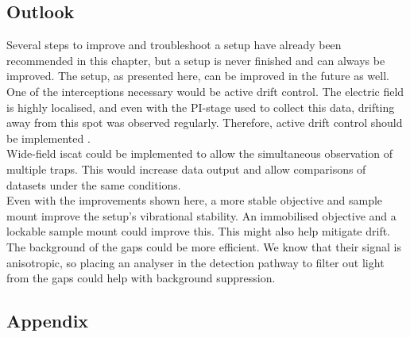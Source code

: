 \subsection*{Outlook}
Several steps to improve and troubleshoot a setup have already been recommended in this chapter, but a setup is never finished and can always be improved. The setup, as presented here, can be improved in the future as well. \\
One of the interceptions necessary would be active drift control. The electric field is highly localised, and even with the PI-stage used to collect this data, drifting away from this spot was observed regularly. Therefore, active drift control should be implemented \cite{niederauerK2}\cite{2015CRISP}\cite{bellve2014Design}. \\
Wide-field \gls{iscat} could be implemented to allow the simultaneous observation of multiple traps. This would increase data output and allow comparisons of datasets under the same conditions. \\
Even with the improvements shown here, a more stable objective and sample mount improve the setup's vibrational stability. An immobilised objective and a lockable sample mount could improve this. This might also help mitigate drift. \\
The background of the gaps could be more efficient. We know that their \scat signal is anisotropic, so placing an analyser in the detection pathway to filter out light from the gaps could help with background suppression.


\newpage

% 

\newpage
\subsection*{Appendix}

\FloatBarrier